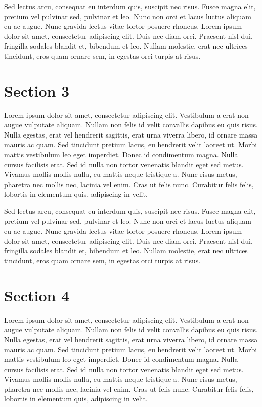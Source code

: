 \documentclass[11pt, a4paper, twocolumn]{article} %
\begin{document}
{Sed lectus arcu, consequat eu interdum quis, suscipit nec risus. Fusce magna elit, pretium vel pulvinar sed, pulvinar et leo. Nunc non orci et lacus luctus aliquam eu ac augue. Nunc gravida lectus vitae tortor posuere rhoncus. Lorem ipsum dolor sit amet, consectetur adipiscing elit. Duis nec diam orci. Praesent nisl dui, fringilla sodales blandit et, bibendum et leo. Nullam molestie, erat nec ultrices tincidunt, eros quam ornare sem, in egestas orci turpis at risus.
\section{Section 3}
Lorem ipsum dolor sit amet, consectetur adipiscing elit. Vestibulum a erat non augue vulputate aliquam. Nullam non felis id velit convallis dapibus eu quis risus. Nulla egestas, erat vel hendrerit sagittis, erat urna viverra libero, id ornare massa mauris ac quam. Sed tincidunt pretium lacus, eu hendrerit velit laoreet ut. Morbi mattis vestibulum leo eget imperdiet. Donec id condimentum magna. Nulla cursus facilisis erat. Sed id nulla non tortor venenatis blandit eget sed metus. Vivamus mollis mollis nulla, eu mattis neque tristique a. Nunc risus metus, pharetra nec mollis nec, lacinia vel enim. Cras ut felis nunc. Curabitur felis felis, lobortis in elementum quis, adipiscing in velit.

Sed lectus arcu, consequat eu interdum quis, suscipit nec risus. Fusce magna elit, pretium vel pulvinar sed, pulvinar et leo. Nunc non orci et lacus luctus aliquam eu ac augue. Nunc gravida lectus vitae tortor posuere rhoncus. Lorem ipsum dolor sit amet, consectetur adipiscing elit. Duis nec diam orci. Praesent nisl dui, fringilla sodales blandit et, bibendum et leo. Nullam molestie, erat nec ultrices tincidunt, eros quam ornare sem, in egestas orci turpis at risus.
\section{Section 4}
Lorem ipsum dolor sit amet, consectetur adipiscing elit. Vestibulum a erat non augue vulputate aliquam. Nullam non felis id velit convallis dapibus eu quis risus. Nulla egestas, erat vel hendrerit sagittis, erat urna viverra libero, id ornare massa mauris ac quam. Sed tincidunt pretium lacus, eu hendrerit velit laoreet ut. Morbi mattis vestibulum leo eget imperdiet. Donec id condimentum magna. Nulla cursus facilisis erat. Sed id nulla non tortor venenatis blandit eget sed metus. Vivamus mollis mollis nulla, eu mattis neque tristique a. Nunc risus metus, pharetra nec mollis nec, lacinia vel enim. Cras ut felis nunc. Curabitur felis felis, lobortis in elementum quis, adipiscing in velit.

}
\end{document}
